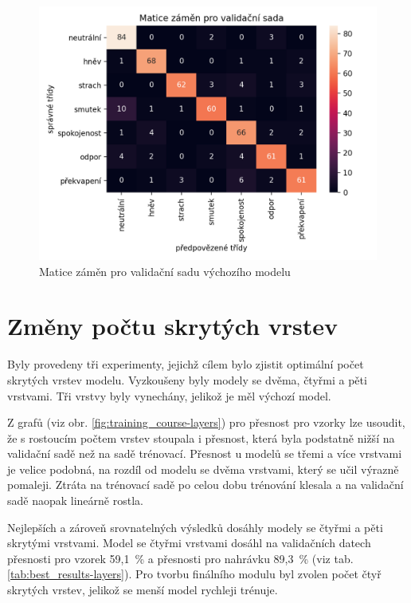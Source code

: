 \documentclass[FM,BP]{tulthesis}
\begin{document}
\begin{figure}[!htbp]
\centerline{\includegraphics[scale=.5]{baseline-conf_matrix-val.png}}
\caption{Matice záměn pro validační sadu výchozího modelu}
\label{fig:conf_matrix-val-baseline}
\end{figure}
\FloatBarrier

\section{Změny počtu skrytých vrstev} %
Byly provedeny tři experimenty, jejichž cílem bylo zjistit optimální počet skrytých vrstev modelu. Vyzkoušeny byly modely se dvěma, čtyřmi a pěti vrstvami. Tři vrstvy byly vynechány, jelikož je měl výchozí model.

Z grafů (viz obr. \mbox{\ref{fig:training_course-layers}})  pro přesnost pro vzorky lze usoudit, že s rostoucím počtem vrstev stoupala i přesnost, která byla podstatně nižší na validační sadě než na sadě trénovací. Přesnost u modelů se třemi a více vrstvami je velice podobná, na rozdíl od modelu se dvěma vrstvami, který se učil výrazně pomaleji. Ztráta na trénovací sadě po celou dobu trénování klesala a na validační sadě naopak lineárně rostla. 

Nejlepších a zároveň srovnatelných výsledků dosáhly modely se čtyřmi a pěti skrytými vrstvami. Model se čtyřmi vrstvami dosáhl na validačních datech přesnosti pro vzorek \mbox{59,1 \%} a přesnosti pro nahrávku \mbox{89,3 \%} (viz tab. \mbox{\ref{tab:best_results-layers}}). Pro tvorbu finálního modulu byl zvolen počet čtyř skrytých vrstev, jelikož se menší model rychleji trénuje.
\end{document}
